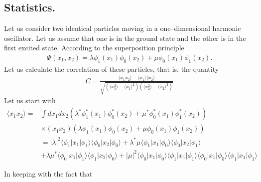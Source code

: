 \begin{subappendices}
\section{Statistics.}\label{App6G}
Let us consider two identical particles moving in a one--dimensional harmonic oscillator. Let us assume  that one is in the ground state and the other  is in the first excited state. According to the superposition principle 
\begin{align}\label{eqApp6G1}
\Phi(x_1,x_2)=\lambda\phi_1(x_1)\phi_0(x_2)+\mu\phi_0(x_1)\phi_1(x_2).
\end{align} 
Let us calculate the correlation of these particles, that is, the quantity
\begin{align}\label{eqApp6G2}
C=\frac{\langle x_1x_2\rangle-\langle x_1\rangle\langle x_2\rangle}{\sqrt{\left(\langle x_1^2\rangle-\langle x_1\rangle^2\right)\left(\langle x_2^2\rangle-\langle x_2\rangle^2\right)}}
\end{align} 
Let us start with
\begin{align}\label{eqApp63}
\nonumber\langle x_1x_2\rangle=&\int dx_1 dx_2 \left(\lambda^*\phi_1^*(x_1)\phi_0^*(x_2)+\mu^*\phi_0^*(x_1)\phi_1^*(x_2)\right)\\
\nonumber&\times(x_1 x_2)\left(\lambda\phi_1(x_1)\phi_0(x_2)+\mu\phi_0(x_1)\phi_1(x_2)\right)\\
\nonumber &=|\lambda|^2\langle\phi_1|x_1|\phi_1\rangle\langle\phi_0|x_2|\phi_0\rangle+\lambda^*\mu\langle\phi_1|x_1|\phi_0\rangle\langle\phi_0|x_2|\phi_1\rangle\\
&+\lambda\mu^*\langle\phi_0|x_1|\phi_1\rangle\langle\phi_1|x_2|\phi_0\rangle+|\mu|^2\langle\phi_0|x_1|\phi_0\rangle\langle\phi_1|x_1|\phi_1\rangle\langle\phi_0|x_1|\phi_0\rangle\langle\phi_1|x_1|\phi_1\rangle
\end{align} 

In keeping with the fact that


\end{subappendices}
